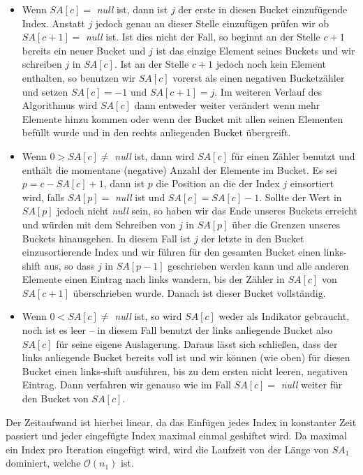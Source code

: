 \begin{itemize}
\item Wenn $SA[c] = $ \textit{null} ist, dann ist $j$ der erste in diesen Bucket einzufügende Index. Anstatt $j$ jedoch genau an dieser Stelle einzufügen prüfen wir ob $SA[c+1]  = $ \textit{null} ist. Ist dies nicht der Fall, so beginnt an der Stelle $c+1$ bereits ein neuer Bucket und $j$ ist das einzige Element seines Buckets und wir schreiben $j$ in $SA[c]$. Ist an der Stelle $c+1$ jedoch noch kein Element enthalten, so benutzen wir $SA[c]$ vorerst als einen negativen Bucketzähler und setzen $SA[c] = -1$ und $SA[c+1] = j$. Im weiteren Verlauf des Algorithmus wird $SA[c]$ dann entweder weiter verändert wenn mehr Elemente hinzu kommen oder wenn der Bucket mit allen seinen Elementen befüllt wurde und in den rechts anliegenden Bucket übergreift.
\item Wenn $ 0 > SA[c] \neq$ \textit{null} ist, dann wird $SA[c]$ für einen Zähler benutzt und enthält die momentane (negative) Anzahl der Elemente im Bucket. Es sei $p = c - SA[c] + 1$, dann ist $p$ die Position an die der Index $j$ einsortiert wird, falls $SA[p] = $ \textit{null} ist und $SA[c] = SA[c] - 1$. Sollte der Wert in $SA[p]$ jedoch nicht \textit{null} sein, so haben wir das Ende unseres Buckets erreicht und würden mit dem Schreiben von $j$ in $SA[p]$ über die Grenzen unseres Buckets hinausgehen. In diesem Fall ist $j$ der letzte in den Bucket einzusortierende Index und wir führen für den gesamten Bucket einen links-shift aus, so dass $j$ in $SA[p-1]$ geschrieben werden kann und alle anderen Elemente einen Eintrag nach links wandern, bis der Zähler in $SA[c]$ von $SA[c+1]$ überschrieben wurde. Danach ist dieser Bucket vollständig.
\item Wenn $ 0 < SA[c] \neq$ \textit{null} ist, so wird $SA[c]$ weder als Indikator gebraucht, noch ist es leer -- in diesem Fall benutzt der links anliegende Bucket also $SA[c]$ für seine eigene Auslagerung. Daraus lässt sich schließen, dass der links anliegende Bucket bereits voll ist und wir können (wie oben) für diesen Bucket einen links-shift ausführen, bis zu dem ersten nicht leeren, negativen Eintrag. Dann verfahren wir genauso wie im Fall $SA[c] = $ \textit{null} weiter für den Bucket von $SA[c]$.
\end{itemize}

Der Zeitaufwand ist hierbei linear, da das Einfügen jedes Index in konstanter Zeit passiert und jeder eingefügte Index maximal einmal geshiftet wird. Da maximal ein Index pro Iteration eingefügt wird, wird die Laufzeit von der Länge von $SA_1$ dominiert, welche $\mathcal O(n_1)$ ist.

